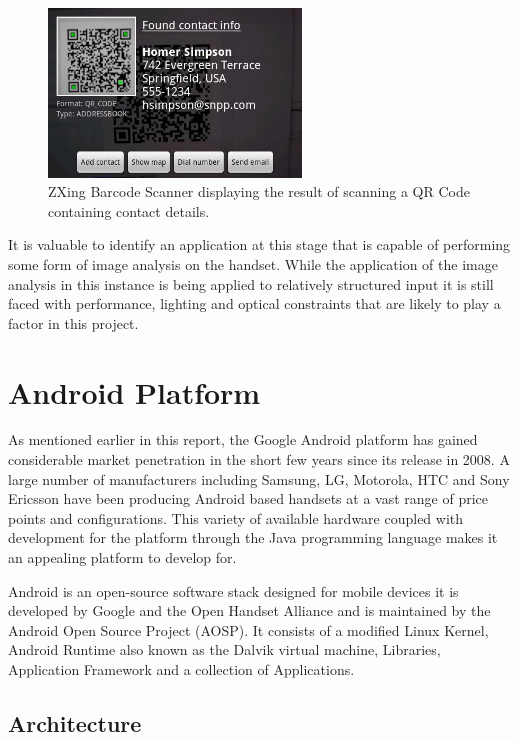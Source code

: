 \begin{figure}[h!]
\centering
    \includegraphics[width=0.6\textwidth]{research/images/zxing_barcode.jpeg}
	
	\caption[ZXing Barcode Scanner]%
    {ZXing Barcode Scanner displaying the result of scanning a QR Code containing contact details.}
	\label{zxing_scanner}
\end{figure}

It is valuable to identify an application at this stage that is capable of performing some form of image analysis on the handset. While the application of the image analysis in this instance is being applied to relatively structured input it is still faced with performance, lighting and optical constraints that are likely to play a factor in this project.

\section{Android Platform}
As mentioned earlier in this report, the Google Android platform has gained considerable market penetration in the short few years since its release in 2008. A large number of manufacturers including Samsung, LG, Motorola, HTC and Sony Ericsson have been producing Android based handsets at a vast range of price points and configurations. This variety of available hardware coupled with development for the platform through the Java programming language makes it an appealing platform to develop for.

Android is an open-source software stack designed for mobile devices it is developed by Google and the Open Handset Alliance and is maintained by the Android Open Source Project (AOSP). It consists of a modified Linux Kernel, Android Runtime also known as the Dalvik virtual machine, Libraries, Application Framework and a collection of Applications.

\subsection{Architecture}
